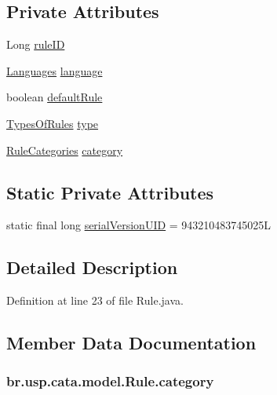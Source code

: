 \subsection*{Private Attributes}
\begin{DoxyCompactItemize}
\item 
Long \hyperlink{classbr_1_1usp_1_1cata_1_1model_1_1_rule_ad227e5272ff0fab9cd3f12faf5cfbb8e}{rule\+I\+D}
\item 
\hyperlink{enumbr_1_1usp_1_1cata_1_1model_1_1_languages}{Languages} \hyperlink{classbr_1_1usp_1_1cata_1_1model_1_1_rule_a6a70b9b6688aac9ad8807b408725ee16}{language}
\item 
boolean \hyperlink{classbr_1_1usp_1_1cata_1_1model_1_1_rule_a4b72bd669675605d206a93e1fa44fcad}{default\+Rule}
\item 
\hyperlink{enumbr_1_1usp_1_1cata_1_1model_1_1_types_of_rules}{Types\+Of\+Rules} \hyperlink{classbr_1_1usp_1_1cata_1_1model_1_1_rule_a1a315aef4010c0013e98cca88b17477a}{type}
\item 
\hyperlink{enumbr_1_1usp_1_1cata_1_1model_1_1_rule_categories}{Rule\+Categories} \hyperlink{classbr_1_1usp_1_1cata_1_1model_1_1_rule_aef3cf506541f10c2d9517c78150578f5}{category}
\end{DoxyCompactItemize}
\subsection*{Static Private Attributes}
\begin{DoxyCompactItemize}
\item 
static final long \hyperlink{classbr_1_1usp_1_1cata_1_1model_1_1_rule_a1c11fae4633358130f0250111ffe75da}{serial\+Version\+U\+I\+D} = 943210483745025\+L
\end{DoxyCompactItemize}


\subsection{Detailed Description}


Definition at line 23 of file Rule.\+java.



\subsection{Member Data Documentation}
\hypertarget{classbr_1_1usp_1_1cata_1_1model_1_1_rule_aef3cf506541f10c2d9517c78150578f5}{
\subsubsection[{category}]{ br.\+usp.\+cata.\+model.\+Rule.\+category\hspace{0.3cm}{\ttfamily [private]}}}\label{classbr_1_1usp_1_1cata_1_1model_1_1_rule_aef3cf506541f10c2d9517c78150578f5}


